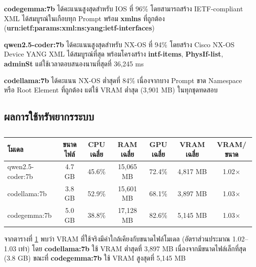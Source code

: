 \hspace*{1.3em}
\textbf{codegemma:7b} ได้คะแนนสูงสุดสำหรับ IOS ที่ 96\% โดยสามารถสร้าง IETF-compliant XML ได้สมบูรณ์ในเกือบทุก Prompt พร้อม \textbf{xmlns} ที่ถูกต้อง (\textbf{urn:ietf:params:xml:ns:yang:ietf-interfaces})

\hspace*{1.3em}
\textbf{qwen2.5-coder:7b} ได้คะแนนสูงสุดสำหรับ NX-OS ที่ 94\% โดยสร้าง Cisco NX-OS Device YANG XML ได้สมบูรณ์ที่สุด พร้อมโครงสร้าง \textbf{intf-items}, \textbf{PhysIf-list}, \textbf{adminSt} แต่ใช้เวลาตอบสนองนานที่สุดที่ 36,245 ms

\hspace*{1.3em}
\textbf{codellama:7b} ได้คะแนน NX-OS ต่ำสุดที่ 84\% เนื่องจากบาง Prompt ขาด Namespace หรือ Root Element ที่ถูกต้อง แต่ใช้ VRAM ต่ำสุด (3,901 MB) ในทุกชุดทดสอบ

\subsection{ผลการใช้ทรัพยากรระบบ}

\begin{table}[H]
    \caption{}
    \label{tab:benchmark-resources}
    \fontSixTeen
    \centering
    \begin{tabularx}{\textwidth}{|l|c|c|c|c|c|c|}
        \hline
        \textbf{โมเดล} & \textbf{ขนาดไฟล์} & \textbf{CPU เฉลี่ย} & \textbf{RAM เฉลี่ย} & \textbf{GPU เฉลี่ย} & \textbf{VRAM เฉลี่ย} & \textbf{VRAM/ขนาด} \\
        \hline
        qwen2.5-coder:7b & 4.7 GB & 45.6\% & 15,065 MB & 72.4\% & 4,817 MB & 1.02$\times$ \\
        \hline
        codellama:7b & 3.8 GB & 52.9\% & 15,601 MB & 68.1\% & 3,897 MB & 1.03$\times$ \\
        \hline
        codegemma:7b & 5.0 GB & 38.8\% & 17,128 MB & 82.6\% & 5,145 MB & 1.03$\times$ \\
        \hline
    \end{tabularx}
\end{table}

\hspace*{1.3em}
จากตารางที่ \ref{tab:benchmark-resources} พบว่า VRAM ที่ใช้จริงมีค่าใกล้เคียงกับขนาดไฟล์โมเดล (อัตราส่วนประมาณ 1.02--1.03 เท่า) โดย \textbf{codellama:7b} ใช้ VRAM ต่ำสุดที่ 3,897 MB เนื่องจากมีขนาดไฟล์เล็กที่สุด (3.8 GB) ขณะที่ \textbf{codegemma:7b} ใช้ VRAM สูงสุดที่ 5,145 MB

